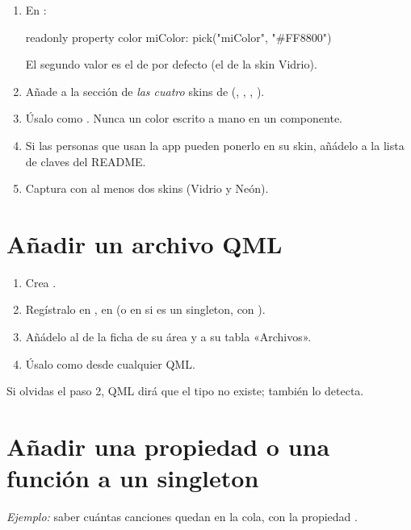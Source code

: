 \begin{enumerate}
  \item En :
\begin{qml}
readonly property color miColor: pick("miColor", "#FF8800")
\end{qml}
  El segundo valor es el de por defecto (el de la skin Vidrio).
  \item Añade  a la sección  de \emph{las cuatro} skins
  de  (, , , ).
  \item Úsalo como . Nunca un color escrito a mano en un componente.
  \item Si las personas que usan la app pueden ponerlo en su skin, añádelo a la lista de
  claves del README.
  \item Captura con al menos dos skins (Vidrio y Neón).
\end{enumerate}

\section{Añadir un archivo QML}

\begin{enumerate}
  \item Crea .
  \item Regístralo en , en  (o en  si
  es un singleton, con ).
  \item Añádelo al  de la ficha de su área y a su tabla «Archivos».
  \item Úsalo como  desde cualquier QML.
\end{enumerate}

Si olvidas el paso 2, QML dirá que el tipo no existe;  también lo detecta.

\section{Añadir una propiedad o una función a un singleton}

\emph{Ejemplo:} saber cuántas canciones quedan en la cola, con la propiedad .

